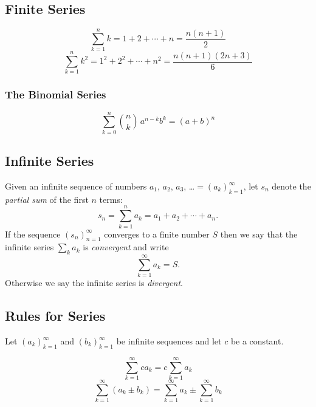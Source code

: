 \documentclass[captions=tableheading]{scrbook}
\begin{document}
\begin{example}
\subsection{Finite Series}
\label{sec-21-3-1}


\begin{equation}
\sum_{k=1}^{n}k=1+2+\cdots+n=\frac{n(n+1)}{2}\label{eq-gauss-series}
\end{equation}
\begin{equation}
\sum_{k=1}^{n}k^{2}=1^{2}+2^{2}+\cdots+n^{2}=\frac{n(n+1)(2n+3)}{6}\label{eq-gauss-series-sq}
\end{equation}
\subsubsection{The Binomial Series}
\label{sec-21-3-1-1}

\begin{equation}
\sum_{k=0}^{n}{n \choose k}\, a^{n-k}b^{k}=(a+b)^{n}\label{eq-binom-series}
\end{equation}
\subsection{Infinite Series}
\label{sec-21-3-2}


Given an infinite sequence of numbers \(a_{1}\), \(a_{2}\), \(a_{3}\), \ldots{}\(=\left(a_{k}\right)_{k=1}^{\infty}\), let \(s_{n}\) denote the \emph{partial sum} of the first \(n\) terms:
\begin{equation}
s_{n}=\sum_{k=1}^{n}a_{k}=a_{1}+a_{2}+\cdots+a_{n}.
\end{equation}
If the sequence \(\left(s_{n}\right)_{n=1}^{\infty}\) converges to a finite number \(S\) then we say that the infinite series \(\sum_{k}a_{k}\) is \emph{convergent} and write
\begin{equation}
\sum_{k=1}^{\infty}a_{k}=S.
\end{equation}
Otherwise we say the infinite series is \emph{divergent}.
\subsection{Rules for Series}
\label{sec-21-3-3}


Let \(\left(a_{k}\right)_{k=1}^{\infty}\) and \(\left(b_{k}\right)_{k=1}^{\infty}\) be infinite sequences and let \(c\) be a constant.

\begin{equation}
\sum_{k=1}^{\infty}ca_{k}=c\sum_{k=1}^{\infty}a_{k}
\end{equation}
\begin{equation}
\sum_{k=1}^{\infty}(a_{k}\pm b_{k})=\sum_{k=1}^{\infty}a_{k}\pm\sum_{k=1}^{\infty}b_{k}
\end{equation}


\end{example}
\end{document}
